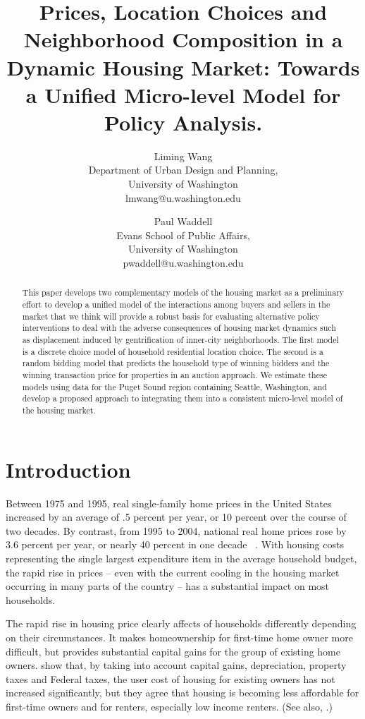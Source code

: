 \documentclass{article}
\title{Prices, Location Choices and Neighborhood Composition in a Dynamic Housing Market:
Towards a Unified Micro-level Model for Policy Analysis.
}
\author{Liming Wang \\ Department of Urban Design and Planning, \\
University of Washington \\ lmwang@u.washington.edu \and
Paul Waddell \\ Evans School of Public Affairs, \\
University of Washington \\ pwaddell@u.washington.edu}
\date{}
\begin{document}
\maketitle

\doublespacing
\begin{abstract}
  This paper develops two complementary models of the housing market as a preliminary effort
  to develop a unified model of the interactions among buyers and sellers in the market that
  we think will provide a robust basis for evaluating alternative policy interventions to deal
  with the adverse consequences of housing market dynamics such as displacement induced by
  gentrification of inner-city neighborhoods. The first model is a discrete choice model of
  household residential location choice.  The second is a random bidding model that predicts
  the household type of winning bidders and the winning transaction price for properties in an
  auction approach.  We estimate these models using data for the Puget Sound region containing
  Seattle, Washington, and develop a proposed approach to integrating them into a consistent
  micro-level model of the housing market.
\end{abstract}

\pagebreak

\section{Introduction}
\label{intro}
Between 1975 and 1995, real single-family home prices in
the United States increased by an average of .5 percent per
year, or 10 percent over the course of two decades. By
contrast, from 1995 to 2004, national real home prices rose by
3.6 percent per year, or nearly 40 percent in one
decade ~\cite{Shiller2006,Shiller2005}. With housing
costs representing the single largest expenditure item in
the average household budget, the rapid rise in prices -- even with the current
cooling in the housing market occurring in many parts of the country -- has a
substantial impact on most households.

The rapid rise in housing price clearly affects
of households differently depending on their circumstances. It makes
homeownership for first-time home owner more difficult, but
provides substantial capital gains for the group of
existing home owners. 
show that, by taking into account capital
gains, depreciation, property taxes and Federal taxes, the user
cost of housing for existing owners has not increased
significantly, but they agree that housing is becoming
less affordable for first-time owners and for renters, especially
low income renters. (See also, \cite{Quigley2005,Himmelberg2005}.) 
\end{document}
